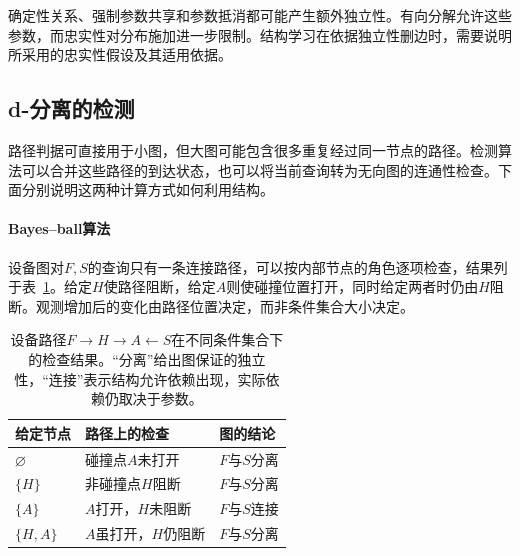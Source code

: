 确定性关系、强制参数共享和参数抵消都可能产生额外独立性。有向分解允许这些参数，而忠实性对分布施加进一步限制。结构学习在依据独立性删边时，需要说明所采用的忠实性假设及其适用依据。

\subsection{d-分离的检测}
\label{sec:pgm-directed-d-separation-testing}

路径判据可直接用于小图，但大图可能包含很多重复经过同一节点的路径。检测算法可以合并这些路径的到达状态，也可以将当前查询转为无向图的连通性检查。下面分别说明这两种计算方式如何利用结构。

\begingroup
\let\subsubsection\paragraph

\subsubsection{Bayes--ball算法}
\label{sec:pgm-directed-bayes-ball}

设备图对$F,S$的查询只有一条连接路径，可以按内部节点的角色逐项检查，结果列于表~\ref{tab:pgm-directed-path-tests}。给定$H$使路径阻断，给定$A$则使碰撞位置打开，同时给定两者时仍由$H$阻断。观测增加后的变化由路径位置决定，而非条件集合大小决定。

\begin{table}[htbp]
  \centering
  \begin{tabularx}{\linewidth}{@{}lXX@{}}
    \toprule
    给定节点 & 路径上的检查 & 图的结论 \\
    \midrule
    $\varnothing$ & 碰撞点$A$未打开 & $F$与$S$分离 \\
    $\{H\}$ & 非碰撞点$H$阻断 & $F$与$S$分离 \\
    $\{A\}$ & $A$打开，$H$未阻断 & $F$与$S$连接 \\
    $\{H,A\}$ & $A$虽打开，$H$仍阻断 & $F$与$S$分离 \\
    \bottomrule
  \end{tabularx}
  \caption{设备路径$F\to H\to A\leftarrow S$在不同条件集合下的检查结果。“分离”给出图保证的独立性，“连接”表示结构允许依赖出现，实际依赖仍取决于参数。}
  \label{tab:pgm-directed-path-tests}
\end{table}
\FloatBarrier

